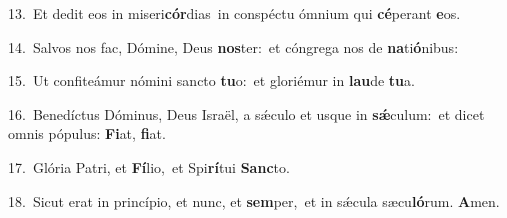 {\numbfont\textcolor{\numbcolor}{13.}}~Et dedit eos in miseri\-\textbf{cór}\-dias~\star in conspéctu ómnium qui \textbf{cé}\-perant \textbf{e}\-os.\par
{\numbfont\textcolor{\numbcolor}{14.}}~Salvos nos fac, Dómine, Deus \textbf{nos}\-ter:~\star et cóngrega nos de \textbf{na}\-ti\-\textbf{ó}\-nibus:\par
{\numbfont\textcolor{\numbcolor}{15.}}~Ut confiteámur nómini sancto \textbf{tu}\-o:~\star et gloriémur in \textbf{lau}\-de \textbf{tu}\-a.\par
{\numbfont\textcolor{\numbcolor}{16.}}~Benedíctus Dóminus, Deus Israël, a sǽculo et usque in \textbf{sǽ}\-culum:~\star et dicet omnis pópulus: \textbf{Fi}\-at, \textbf{fi}\-at.\par
{\numbfont\textcolor{\numbcolor}{17.}}~Glória Patri, et \textbf{Fí}\-lio,~\star et Spi\-\textbf{rí}\-tui \textbf{Sanc}\-to.\par
{\numbfont\textcolor{\numbcolor}{18.}}~Sicut erat in princípio, et nunc, et \textbf{sem}\-per,~\star et in sǽcula sæcu\-\textbf{ló}\-rum. \textbf{A}\-men.\par
